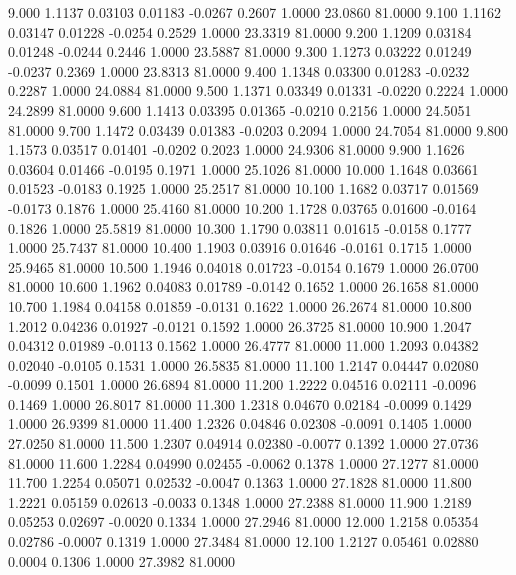    9.000   1.1137   0.03103   0.01183  -0.0267   0.2607   1.0000  23.0860  81.0000
   9.100   1.1162   0.03147   0.01228  -0.0254   0.2529   1.0000  23.3319  81.0000
   9.200   1.1209   0.03184   0.01248  -0.0244   0.2446   1.0000  23.5887  81.0000
   9.300   1.1273   0.03222   0.01249  -0.0237   0.2369   1.0000  23.8313  81.0000
   9.400   1.1348   0.03300   0.01283  -0.0232   0.2287   1.0000  24.0884  81.0000
   9.500   1.1371   0.03349   0.01331  -0.0220   0.2224   1.0000  24.2899  81.0000
   9.600   1.1413   0.03395   0.01365  -0.0210   0.2156   1.0000  24.5051  81.0000
   9.700   1.1472   0.03439   0.01383  -0.0203   0.2094   1.0000  24.7054  81.0000
   9.800   1.1573   0.03517   0.01401  -0.0202   0.2023   1.0000  24.9306  81.0000
   9.900   1.1626   0.03604   0.01466  -0.0195   0.1971   1.0000  25.1026  81.0000
  10.000   1.1648   0.03661   0.01523  -0.0183   0.1925   1.0000  25.2517  81.0000
  10.100   1.1682   0.03717   0.01569  -0.0173   0.1876   1.0000  25.4160  81.0000
  10.200   1.1728   0.03765   0.01600  -0.0164   0.1826   1.0000  25.5819  81.0000
  10.300   1.1790   0.03811   0.01615  -0.0158   0.1777   1.0000  25.7437  81.0000
  10.400   1.1903   0.03916   0.01646  -0.0161   0.1715   1.0000  25.9465  81.0000
  10.500   1.1946   0.04018   0.01723  -0.0154   0.1679   1.0000  26.0700  81.0000
  10.600   1.1962   0.04083   0.01789  -0.0142   0.1652   1.0000  26.1658  81.0000
  10.700   1.1984   0.04158   0.01859  -0.0131   0.1622   1.0000  26.2674  81.0000
  10.800   1.2012   0.04236   0.01927  -0.0121   0.1592   1.0000  26.3725  81.0000
  10.900   1.2047   0.04312   0.01989  -0.0113   0.1562   1.0000  26.4777  81.0000
  11.000   1.2093   0.04382   0.02040  -0.0105   0.1531   1.0000  26.5835  81.0000
  11.100   1.2147   0.04447   0.02080  -0.0099   0.1501   1.0000  26.6894  81.0000
  11.200   1.2222   0.04516   0.02111  -0.0096   0.1469   1.0000  26.8017  81.0000
  11.300   1.2318   0.04670   0.02184  -0.0099   0.1429   1.0000  26.9399  81.0000
  11.400   1.2326   0.04846   0.02308  -0.0091   0.1405   1.0000  27.0250  81.0000
  11.500   1.2307   0.04914   0.02380  -0.0077   0.1392   1.0000  27.0736  81.0000
  11.600   1.2284   0.04990   0.02455  -0.0062   0.1378   1.0000  27.1277  81.0000
  11.700   1.2254   0.05071   0.02532  -0.0047   0.1363   1.0000  27.1828  81.0000
  11.800   1.2221   0.05159   0.02613  -0.0033   0.1348   1.0000  27.2388  81.0000
  11.900   1.2189   0.05253   0.02697  -0.0020   0.1334   1.0000  27.2946  81.0000
  12.000   1.2158   0.05354   0.02786  -0.0007   0.1319   1.0000  27.3484  81.0000
  12.100   1.2127   0.05461   0.02880   0.0004   0.1306   1.0000  27.3982  81.0000
